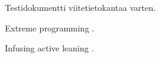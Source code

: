 \documentclass{article}
\begin{document}
Testidokumentti viitetietokantaa varten.

Extreme programming \cite{BA04}.

Infusing active leaning \cite{W04}.




\end{document}
